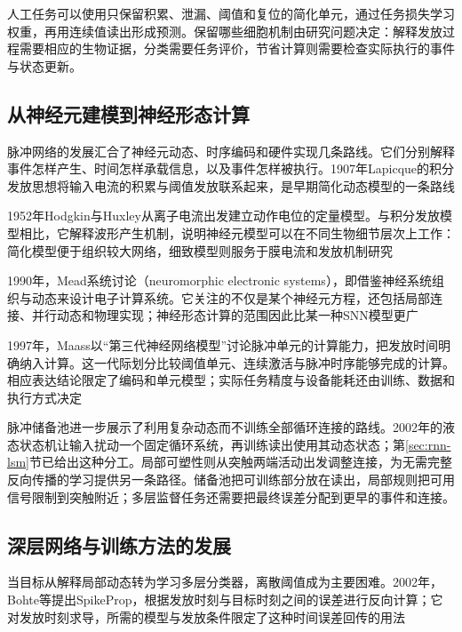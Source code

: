 人工任务可以使用只保留积累、泄漏、阈值和复位的简化单元，通过任务损失学习权重，再用连续值读出形成预测。保留哪些细胞机制由研究问题决定：解释发放过程需要相应的生物证据，分类需要任务评价，节省计算则需要检查实际执行的事件与状态更新。

\subsection{从神经元建模到神经形态计算}
\label{sec:snn-early-history}

脉冲网络的发展汇合了神经元动态、时序编码和硬件实现几条路线。它们分别解释事件怎样产生、时间怎样承载信息，以及事件怎样被执行。1907年Lapicque的积分发放思想将输入电流的积累与阈值发放联系起来，是早期简化动态模型的一条路线

1952年Hodgkin与Huxley从离子电流出发建立动作电位的定量模型。与积分发放模型相比，它解释波形产生机制，说明神经元模型可以在不同生物细节层次上工作：简化模型便于组织较大网络，细致模型则服务于膜电流和发放机制研究

1990年，Mead系统讨论（neuromorphic electronic systems），即借鉴神经系统组织与动态来设计电子计算系统。它关注的不仅是某个神经元方程，还包括局部连接、并行动态和物理实现；神经形态计算的范围因此比某一种SNN模型更广

1997年，Maass以“第三代神经网络模型”讨论脉冲单元的计算能力，把发放时间明确纳入计算。这一代际划分比较阈值单元、连续激活与脉冲时序能够完成的计算。相应表达结论限定了编码和单元模型；实际任务精度与设备能耗还由训练、数据和执行方式决定

脉冲储备池进一步展示了利用复杂动态而不训练全部循环连接的路线。2002年的液态状态机让输入扰动一个固定循环系统，再训练读出使用其动态状态；第\ref{sec:rnn-lsm}节已给出这种分工。局部可塑性则从突触两端活动出发调整连接，为无需完整反向传播的学习提供另一条路径。储备池把可训练部分放在读出，局部规则把可用信号限制到突触附近；多层监督任务还需要把最终误差分配到更早的事件和连接。

\subsection{深层网络与训练方法的发展}
\label{sec:snn-learning-history}

当目标从解释局部动态转为学习多层分类器，离散阈值成为主要困难。2002年，Bohte等提出SpikeProp，根据发放时刻与目标时刻之间的误差进行反向计算；它对发放时刻求导，所需的模型与发放条件限定了这种时间误差回传的用法

